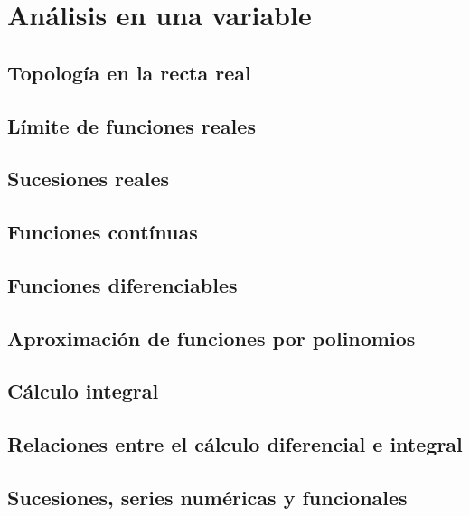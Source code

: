%
%
%

\part{Análisis en una variable}

\chapter{Topología en la recta real}
\chapter{Límite de funciones reales}
\chapter{Sucesiones reales}
\chapter{Funciones contínuas}
\chapter{Funciones diferenciables}
\chapter{Aproximación de funciones por polinomios}
\chapter{Cálculo integral}
\chapter{Relaciones entre el cálculo diferencial e integral}
\chapter{Sucesiones, series numéricas y funcionales}




